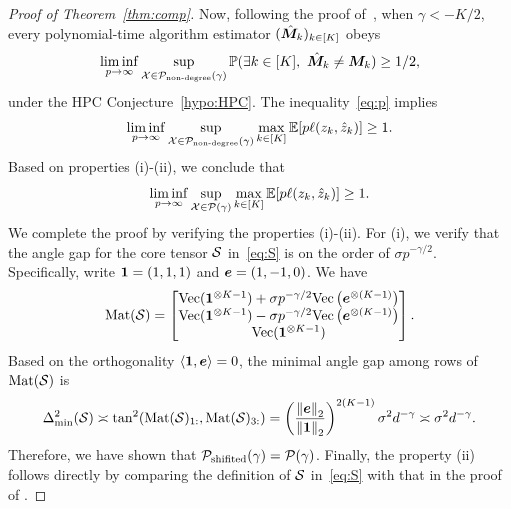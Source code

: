 \documentclass[lettersize,journal]{IEEEtran}
\theoremstyle{definition}
\theoremstyle{definition}
\newcommand{\Mat}{\text{Mat}}
\def\fixme#1#2{\textbf{\color{red}[FIXME (#1): #2]}}
\begin{document}
\begin{proof}[Proof of Theorem~\ref{thm:comp}]
Now, following the proof of~\citet[Theorem 7]{han2020exact}, when $\gamma<-K/2$, every polynomial-time algorithm estimator $(\hat {\bm M}_k)_{k\in[K]}$ obeys
\begin{align}\label{eq:p}
\liminf_{p\to \infty} \sup_{\tX\in \tP_{\text{non-degree}}(\gamma)}\mathbb{P}(\exists k \in[K],\  \hat \mM_k \neq \mM_k)\geq 1/2,
\end{align}
under the HPC Conjecture~\ref{hypo:HPC}.
The inequality~\eqref{eq:p} implies
\[
\liminf_{p\to \infty} \sup_{\mathcal{X}\in \mathcal{P}_{\text{non-degree}}(\gamma)}\max_{k\in[K]}\mathbb{E}[p\ell(z_k, \hat z_k)]\geq 1.
\]
Based on properties (i)-(ii), we conclude that
\[
\liminf_{p\to \infty} \sup_{\mathcal{X}\in \mathcal{P}(\gamma)}\max_{k\in[K]}\mathbb{E}[p\ell(z_k, \hat z_k)]\geq 1.
\]
We complete the proof by verifying the properties (i)-(ii). For (i), we verify that the angle gap for the core tensor $\mathcal{S}$ in~\eqref{eq:S} is on the order of $\sigma p^{-\gamma/2}$. Specifically, write $\mathbf{1}=(1,1,1)$ and $\bm{e}=(1,-1,0)$. We have
\[
\Mat(\tS)=
\begin{bmatrix}
\text{Vec}(\mone^{\otimes K-1})+\sigma p^{-\gamma/2}\text{Vec}\left(\me^{\otimes (K-1)}\right) \\
\text{Vec}(\mone^{\otimes K-1})-\sigma p^{-\gamma/2}\text{Vec}\left(\me^{\otimes (K-1)}\right) \\
\text{Vec}(\mone^{\otimes K-1})
\end{bmatrix}.
\]
Based on the orthogonality $\langle \mathbf{1}, \bm{e}\rangle=0$, the minimal angle gap among rows of $\Mat(\tS)$ is
\begin{align}
\Delta^2_{\min}(\tS)\asymp \tan^2(\Mat(\tS)_{1:}, \Mat(\tS)_{3:})
=\left(\onorm{\me}_2 \over \onorm{\mone}_2\right)^{2(K-1)} \sigma^2 d^{-\gamma}\asymp \sigma^2 d^{-\gamma}.
\end{align}
Therefore, we have shown that $\mathcal{P}_{\text{shifited}}(\gamma)=\mathcal{P}(\gamma)$. Finally, the property (ii) follows directly by comparing the definition of $\mathcal{S}$ in~\eqref{eq:S} with that in the proof of \citet[Theorem 7]{han2020exact}. 
\end{proof}

\end{document}
